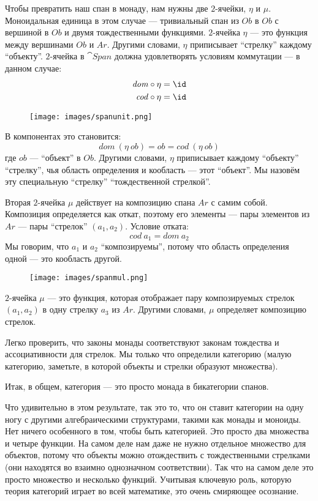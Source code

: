 Чтобы превратить наш спан в монаду, нам нужны две $2$-ячейки, $\eta$ и
$\mu$. Моноидальная единица в этом случае — тривиальный спан из
$\mathit{Ob}$ в $\mathit{Ob}$ с вершиной в $\mathit{Ob}$ и двумя тождественными
функциями. $2$-ячейка $\eta$ — это функция между вершинами
$\mathit{Ob}$ и $\mathit{Ar}$. Другими словами, $\eta$ приписывает
``стрелку'' каждому ``объекту''. $2$-ячейка в $\cat{Span}$ должна удовлетворять
условиям коммутации --- в данном случае:
\begin{align*}
  \mathit{dom} & \circ \eta = \id \\
  \mathit{cod} & \circ \eta = \id
\end{align*}

\begin{figure}[H]
  \centering
  \texttt{[image: images/spanunit.png]}
\end{figure}

\noindent
В компонентах это становится:
\[\mathit{dom}\ (\eta\ \mathit{ob}) = \mathit{ob} = \mathit{cod}\ (\eta\ \mathit{ob})\]
где $\mathit{ob}$ — ``объект'' в $\mathit{Ob}$. Другими словами,
$\eta$ приписывает каждому ``объекту'' ``стрелку'', чья область определения и
кообласть — этот ``объект''. Мы назовём эту специальную ``стрелку''
``тождественной стрелкой''.

Вторая $2$-ячейка $\mu$ действует на композицию спана
$\mathit{Ar}$ с самим собой. Композиция определяется как откат, поэтому
его элементы — пары элементов из $\mathit{Ar}$ --- пары
``стрелок'' $(a_1, a_2)$. Условие отката:
\[\mathit{cod}\ a_1 = \mathit{dom}\ a_2\]
Мы говорим, что $a_1$ и $a_2$ ``композируемы'', потому что
область определения одной — это кообласть другой.

\begin{figure}[H]
  \centering
  \texttt{[image: images/spanmul.png]}
\end{figure}

\noindent
$2$-ячейка $\mu$ — это функция, которая отображает пару композируемых
стрелок $(a_1, a_2)$ в одну стрелку $a_3$ из
$\mathit{Ar}$. Другими словами, $\mu$ определяет композицию стрелок.

Легко проверить, что законы монады соответствуют законам тождества и
ассоциативности для стрелок. Мы только что определили категорию (малую
категорию, заметьте, в которой объекты и стрелки образуют множества).

Итак, в общем, категория — это просто монада в бикатегории спанов.

Что удивительно в этом результате, так это то, что он ставит категории на одну
ногу с другими алгебраическими структурами, такими как монады и моноиды. Нет
ничего особенного в том, чтобы быть категорией. Это просто два множества и четыре
функции. На самом деле нам даже не нужно отдельное множество для объектов,
потому что объекты можно отождествить с тождественными стрелками (они находятся во
взаимно однозначном соответствии). Так что на самом деле это просто множество и несколько
функций. Учитывая ключевую роль, которую теория категорий играет во
всей математике, это очень смиряющее осознание.

